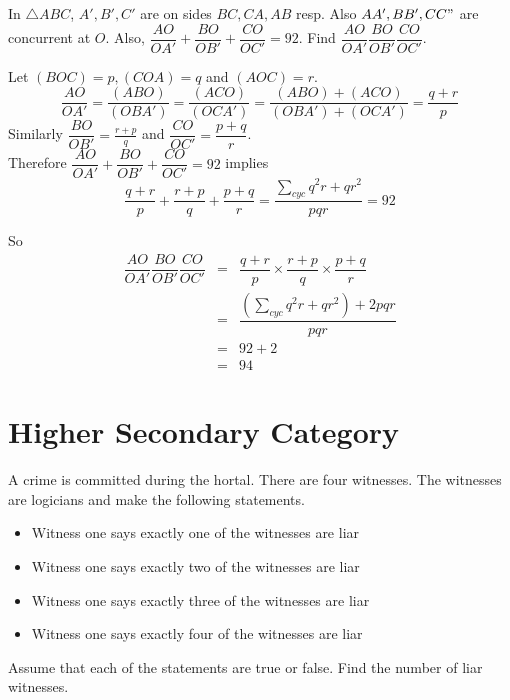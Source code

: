 \documentclass{subfile}
\begin{document}
		\begin{problem}
			In $\triangle ABC$, $A',B',C'$ are on sides $BC,CA,AB$ resp. Also $AA',BB',CC"$ are concurrent at $O$. Also, $\dfrac{AO}{OA'}+\dfrac{BO}{OB'}+\dfrac{CO}{OC'}=92$. Find $\dfrac{AO}{OA'}\dfrac{BO}{OB'}\dfrac{CO}{OC'}$.
		\end{problem}

		\begin{solution} Let $(BOC)=p,(COA)=q$ and $(AOC)=r$.
			$$\dfrac{AO}{OA'}=\dfrac{(ABO)}{(OBA')}=\dfrac{(ACO)}{(OCA')}=\dfrac{(ABO)+(ACO)}{(OBA')+(OCA')}=\dfrac{q+r}{p}$$
			Similarly $\dfrac{BO}{OB'}=\frac{r+p}{q}$  and  $\dfrac{CO}{OC'}=\dfrac{p+q}{r}$.\\
			Therefore $\dfrac{AO}{OA'}+\dfrac{BO}{OB'}+\dfrac{CO}{OC'}=92$ implies\\ $$\dfrac{q+r}{p}+\dfrac{r+p}{q}+\dfrac{p+q}{r}=\frac{\sum_{cyc}^{}{q^2r+qr^2}}{pqr}=92$$



			So \begin{eqnarray*}
				\dfrac{AO}{OA'}\dfrac{BO}{OB'}\dfrac{CO}{OC'}
				& = & \dfrac{q+r}{p}\times \dfrac{r+p}{q}\times \dfrac{p+q}{r}\\
				& = & \dfrac{(\sum_{cyc}^{}{q^2r+qr^2})+2pqr}{pqr}\\
				& = & 92+2\\
				& = & 94
			\end{eqnarray*}

		\end{solution}

	\section{Higher Secondary Category}
	\begin{problem}
		A crime is committed during the hortal. There are four witnesses. The witnesses are logicians and make the following statements.
		\begin{itemize}
			\item Witness one says exactly one of the witnesses are liar
			\item Witness one says exactly two
			of the witnesses are liar
			\item Witness one says exactly three of the witnesses are liar
			\item Witness one says exactly four of the witnesses are liar
		\end{itemize}
		Assume that each of the statements are true or false. Find the number of liar witnesses.
	\end{problem}
\end{document}

